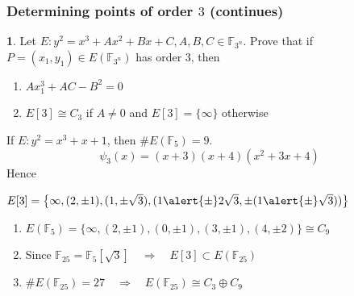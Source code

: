 \documentclass[10pt,handout]{beamer} %
\newcommand{\F}{\mathbb F}
\theoremstyle{definition}
\newtheorem{exercise}[theorem]{\translate{Exercise}}
\begin{document}
\begin{frame}\frametitle{Determining points of order $3$ (continues)}

\begin{exercise} Let $E: y^2=x^3+Ax^2+Bx+C, A,B,C\in\F_{3^n}$. Prove that if $P=(x_1,y_1)\in E(\F_{3^n})$
has order $3$, then
\begin{enumerate}[<+-| alert@+>]
 \item $Ax_1^3+AC-B^2=0$
 \item $E[3]\cong C_3$ if $A\neq0$ and $E[3]=\{\infty\}$ otherwise
\end{enumerate}
\end{exercise}\pause

\begin{example}
If $E: y^2=x^3+x+1$, then $\#E(\F_5)=9$.\pause
$$\psi_3(x)=(x + 3)(x + 4)(x^2 + 3x + 4)$$
Hence
\centerline{$E[3]=\left\{
\infty,(2,\pm1),(1,\pm\sqrt{3}),(1\alert{\pm}2\sqrt{3},\pm(1\alert{\pm}\sqrt{3}))\right\}$}\pause
\begin{enumerate}[<+-| alert@+>]
 \item $E(\F_5)=\{\infty,(2,\pm1),(0,\pm1),(3,\pm1),(4,\pm2)\}\cong C_9$
 \item Since $\F_{25}=\F_5[\sqrt{3}]\quad\Rightarrow\quad  E[3]\subset E(\F_{25})$
 \item $\#E(\F_{25})=27\quad\Rightarrow\quad E(\F_{25})\cong C_3\oplus C_9$
\end{enumerate}


\end{example}
\end{frame}
\end{document}
